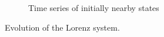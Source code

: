 \begin{figure}[htp]
\begin{subfigure}[b]{.61\textwidth}
        \caption{Time series of initially nearby states}
        \label{fig:lorenz-timeseries-basis-vs-pert}
    \end{subfigure}
    \caption{
        Evolution of the Lorenz system.
    }
    \label{fig:lorenz-basis-vs-pert}
\end{figure}
